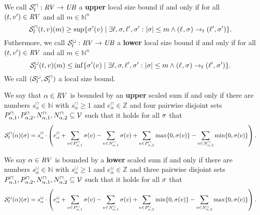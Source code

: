 \begin{definition}
  We call ${\mathcal{S}^\sqcap_l}: \mathit{RV} \rightarrow \mathit{UB}$ a \textbf{upper} local size bound if and only if for all $(t, v') \in \mathit{RV}$ and all $m \in \mathbb{N}^n$
  \[ {\mathcal{S}^\sqcap_l}(t, v)(m) \geq \sup \lbrace \sigma'(v) \mid \exists \ell, \sigma, \ell', \sigma': \left|\sigma\right| \leq m \wedge (\ell_{}, \sigma_{}) \rightarrow_t (\ell', \sigma') \rbrace. \]
  Futhermore, we call ${\mathcal{S}^\sqcup_l}: \mathit{RV} \rightarrow \mathit{UB}$ a \textbf{lower} local size bound if and only if for all $(t, v') \in \mathit{RV}$ and all $m \in \mathbb{N}^n$
  \[ {\mathcal{S}^\sqcup_l}(t, v)(m) \leq \inf \lbrace \sigma'(v) \mid \exists \ell, \sigma, \ell', \sigma': \left|\sigma\right| \leq m \wedge (\ell_{}, \sigma_{}) \rightarrow_t (\ell', \sigma') \rbrace. \]
  We call ${({\mathcal{S}^\sqcup_l}, {\mathcal{S}^\sqcap_l})}$ a local size bound.
\end{definition}

\begin{definition}
  We say that $\alpha \in \mathit{RV}$ is bounded by an \textbf{upper} scaled sum if and only if there are numbers $s^\sqcap_\alpha \in \mathbb{N}$ with $s^\sqcap_\alpha \geq 1$ and $e^\sqcap_\alpha \in \mathbb{Z}$ and four pairwise disjoint sets $P_{\alpha,1}^\sqcap, P_{\alpha,2}^\sqcap, N_{\alpha,1}^\sqcap, N_{\alpha,2}^\sqcap \subseteq \mathcal{V}$ such that it holds for all $\sigma$ that
  \[ {\mathcal{S}^\sqcap_l}(\alpha)(\sigma) =
    s^\sqcap_\alpha \cdot \left(
        e^\sqcap_\alpha
      + \sum_{v \in P_{\alpha,1}^\sqcap} \sigma(v)
      - \sum_{v \in N_{\alpha,1}^\sqcap} \sigma(v)
      + \sum_{v \in P_{\alpha,2}^\sqcap} \max \lbrace 0,\sigma(v) \rbrace
      - \sum_{v \in N_{\alpha,2}^\sqcap} \min \lbrace 0,\sigma(v) \rbrace
    \right). \]

  We say $\alpha \in \mathit{RV}$ is bounded by a \textbf{lower} scaled sum if and only if there are numbers $s^\sqcup_\alpha \in \mathbb{N}$ with $s^\sqcup_\alpha \geq 1$ and $e^\sqcup_\alpha \in \mathbb{Z}$ and three pairwise disjoint sets $P_{\alpha,1}^\sqcap, P_{\alpha,2}^\sqcap, N_{\alpha,1}^\sqcap, N_{\alpha,2}^\sqcap \subseteq \mathcal{V}$ such that it holds for all $\sigma$ that
  \[ {\mathcal{S}^\sqcup_l}(\alpha)(\sigma) =
    s^\sqcup_\alpha \cdot \left(
      e^\sqcup_\alpha
    + \sum_{v \in P_{\alpha,1}^\sqcup} \sigma(v)
    - \sum_{v \in N_{\alpha,1}^\sqcup} \sigma(v)
    + \sum_{v \in P_{\alpha,2}^\sqcup} \min \lbrace 0,\sigma(v) \rbrace
    - \sum_{v \in N_{\alpha,2}^\sqcup} \max \lbrace 0,\sigma(v) \rbrace
  \right). \]
\end{definition}
